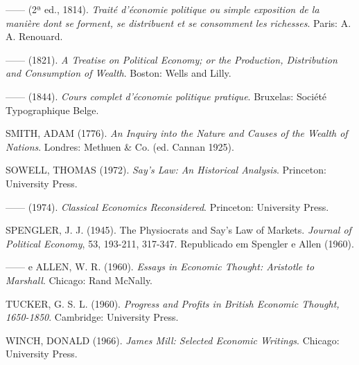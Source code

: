 \documentclass[12pt]{article}
\begin{document}
\noindent ------ (2ª ed., 1814). \textit{Traité d'économie politique ou simple exposition de la manière dont se forment, se distribuent et se consomment les richesses}. Paris: A. A. Renouard.

\noindent ------ (1821). \textit{A Treatise on Political Economy; or the Production, Distribution and Consumption of Wealth}. Boston: Wells and Lilly.

\noindent ------ (1844). \textit{Cours complet d'économie politique pratique}. Bruxelas: Société Typographique Belge.

\noindent SMITH, ADAM (1776). \textit{An Inquiry into the Nature and Causes of the Wealth of Nations}. Londres: Methuen \& Co. (ed. Cannan 1925).

\noindent SOWELL, THOMAS (1972). \textit{Say's Law: An Historical Analysis}. Princeton: University Press.

\noindent ------ (1974). \textit{Classical Economics Reconsidered}. Princeton: University Press.

\noindent SPENGLER, J. J. (1945). The Physiocrats and Say's Law of Markets. \textit{Journal of Political Economy}, 53, 193-211, 317-347. Republicado em Spengler e Allen (1960).

\noindent ------ e ALLEN, W. R. (1960). \textit{Essays in Economic Thought: Aristotle to Marshall}. Chicago: Rand McNally.

\noindent TUCKER, G. S. L. (1960). \textit{Progress and Profits in British Economic Thought, 1650-1850}. Cambridge: University Press.

\noindent WINCH, DONALD (1966). \textit{James Mill: Selected Economic Writings}. Chicago: University Press.
\end{document}

